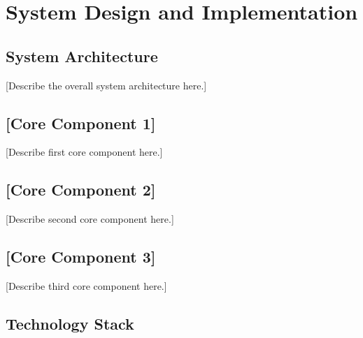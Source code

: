 
\chapter{System Design and Implementation}
\label{ch:methodology}

\section{System Architecture}
\label{sec:ch3:architecture}


[Describe the overall system architecture here.]

\section{[Core Component 1]}
\label{sec:ch3:component1}


[Describe first core component here.]

\section{[Core Component 2]}
\label{sec:ch3:component2}

[Describe second core component here.]

\section{[Core Component 3]}
\label{sec:ch3:component3}

[Describe third core component here.]

\section{Technology Stack}
\label{sec:ch3:tech_stack}

